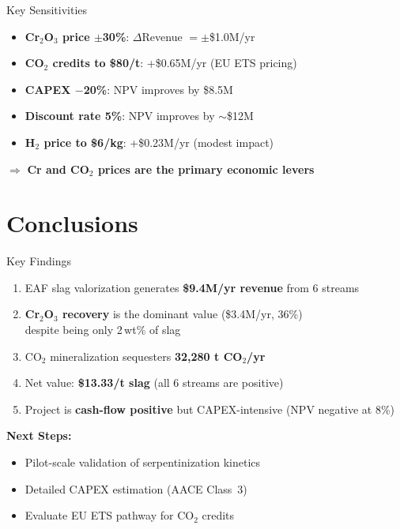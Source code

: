 \documentclass[aspectratio=169]{beamer}
\begin{document}
\begin{frame}{Key Sensitivities}
\begin{itemize}
  \item \textbf{Cr$_2$O$_3$ price $\pm$30\%}: $\Delta$Revenue $= \pm$\$1.0M/yr
  \item \textbf{CO$_2$ credits to \$80/t}: +\$0.65M/yr (EU ETS pricing)
  \item \textbf{CAPEX $-$20\%}: NPV improves by \$8.5M
  \item \textbf{Discount rate 5\%}: NPV improves by $\sim$\$12M
  \item \textbf{H$_2$ price to \$6/kg}: +\$0.23M/yr (modest impact)
\end{itemize}

\vspace{8pt}
$\Rightarrow$ \textbf{Cr and CO$_2$ prices are the primary economic levers}
\end{frame}

\section{Conclusions}

\begin{frame}{Key Findings}
\begin{enumerate}
  \item EAF slag valorization generates \textbf{\$9.4M/yr revenue} from 6 streams
  \item \textbf{Cr$_2$O$_3$ recovery} is the dominant value (\$3.4M/yr, 36\%)\\
        {\small despite being only 2\,wt\% of slag}
  \item CO$_2$ mineralization sequesters \textbf{32,280 t CO$_2$/yr}
  \item Net value: \textcolor{StepGreen}{\textbf{\$13.33/t slag}} (all 6 streams are positive)
  \item Project is \textbf{cash-flow positive} but CAPEX-intensive (NPV negative at 8\%)
\end{enumerate}

\vspace{10pt}
\textbf{Next Steps:}
\begin{itemize}
  \item Pilot-scale validation of serpentinization kinetics
  \item Detailed CAPEX estimation (AACE Class~3)
  \item Evaluate EU ETS pathway for CO$_2$ credits
\end{itemize}
\end{frame}

\closingSlide
\end{document}
